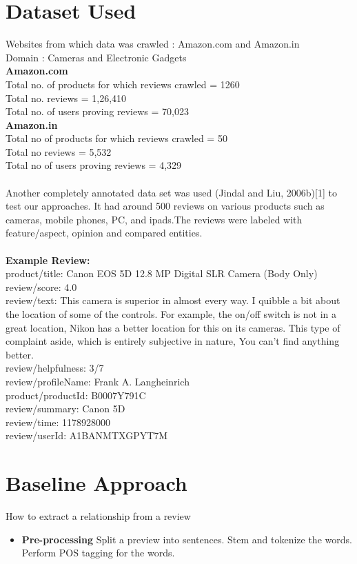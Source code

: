 \documentclass[12pt]{article}
\begin{document}
\section{Dataset Used}
Websites from which data was crawled : Amazon.com and Amazon.in \\
Domain : Cameras and Electronic Gadgets \\
\textbf{Amazon.com}\\
Total no. of products for which reviews crawled =  1260\\
Total no. reviews = 1,26,410\\
Total no. of users proving reviews = 70,023\\
\textbf{Amazon.in}\\
Total no of products for which reviews crawled =  50\\
Total no  reviews = 5,532\\
Total no of users proving reviews = 4,329\\~\\
\noindent
Another completely annotated data set was used (Jindal and Liu, 2006b)[1] to test our approaches. It had around 500 reviews on various products such as cameras, mobile phones, PC, and ipads.The reviews were labeled with feature/aspect, opinion and compared entities.\\~\\
\noindent
\textbf{Example Review:}\\
product/title: Canon EOS 5D 12.8 MP Digital SLR Camera (Body Only)\\
review/score: 4.0\\
review/text: This camera is superior in almost every way. I quibble a bit about the location of some of the controls. For example, the on/off switch is not in a great location, Nikon has a better location for this on its cameras. This type of complaint aside, which is entirely subjective in nature, You can't find anything better.\\
review/helpfulness: 3/7\\
review/profileName: Frank A. Langheinrich\\
product/productId: B0007Y791C\\
review/summary: Canon 5D\\
review/time: 1178928000\\
review/userId: A1BANMTXGPYT7M\\

\section{Baseline Approach}
How to extract a relationship from a review \\
\begin{itemize}
\item \textbf{Pre-processing} Split a preview into sentences. Stem and tokenize the words. Perform POS tagging for the words.
\end{itemize}
\end{document}
